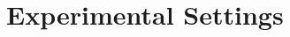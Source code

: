 \documentclass{article}
\newcommand{\alert}[1]{\textcolor{red}{TODO: #1}}
\begin{document}


\begin{table*}[t]
    \centering
    
    \label{tab:bleu_performance2}
    
    \vspace{-4mm}
\end{table*}    

\section{Experimental Settings}
\label{sec:experimental-settings}
\end{document}
